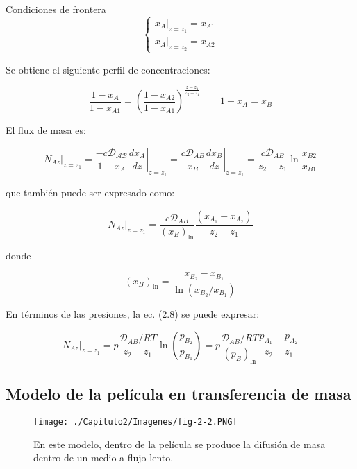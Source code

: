Condiciones de frontera 
\begin{equation}
	\left\{
	\begin{aligned}
	x_A |_{z=z_1} = x_{A1} \\
	x_A |_{z=z_2} = x_{A2}
	\end{aligned}
	\right.
\end{equation}

Se obtiene el siguiente perfil de concentraciones:

\begin{equation}
	\frac{1-x_A}{1-x_{A1}} = \left( \frac{1-x_{A2}}{1-x_{A1}} \right)^{\frac{z-z_1}{z_2-z_1}} 
	\qquad 
	1-x_A = x_B
\end{equation}

El flux de masa es:

\begin{equation}
N_{Az} |_{z=z_1} = \left. \frac{ - c \mathcal{\mathscr{D}_{AB}}}{1-x_A} \frac{dx_A}{dz} \right|_{z=z_1} = \left. \frac{c \mathscr{D}_{AB}}{x_B} \frac{dx_B}{dz} \right|_{z=z_1} =  \frac{c \mathscr{D}_{AB}}{z_2 - z_1} \ln{\frac{x_{B2}}{x_{B1}}}
\end{equation}

que también puede ser expresado como: 

\begin{equation}
	N_{Az}|_{z=z_1} = \frac{c \mathscr{D}_{AB}}{(x_B)_{\ln{}}} \frac{(x_{A_1} - x_{A_2})}{z_2 - z_1}
\end{equation}

donde 

\begin{equation}
(x_B)_{\ln{}} = \frac{x_{B_2} - x_{B_1}}{\ln{(x_{B_2}/x_{B_1})}}
\end{equation}

En términos de las presiones, la ec. (2.8) se puede expresar: 

\begin{equation}
N_{Az}|_{z=z_1} = p \frac{\mathscr{D}_{AB}/RT}{z_2 - z_1} \ln{\left( \frac{p_{B_2}}{p_{B_1}}\right)} = p\frac{\mathscr{D}_{AB}/RT}{(p_B)_{\ln}} \frac{p_{A_1}-p_{A_2}}{z_2 - z_1}
\end{equation}


\subsection{Modelo de la película en transferencia de masa}

\begin{figure}[H]
	\centering
	\texttt{[image: ./Capitulo2/Imagenes/fig-2-2.PNG]}
	\caption{En este modelo, dentro de la película 		se produce la difusión de masa dentro de un 			medio a flujo lento.}
\end{figure}


